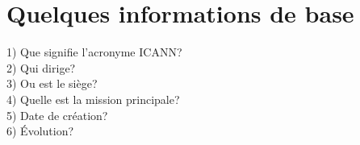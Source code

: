 \documentclass{article}
\begin{document}

\newpage
\section{Quelques informations de base}
1) Que signifie l'acronyme ICANN?\\


2) Qui dirige?\\


3) Ou est le siège?\\


4) Quelle est la mission principale?\\


5) Date de création?\\

6) Évolution?\\

\end{document}
